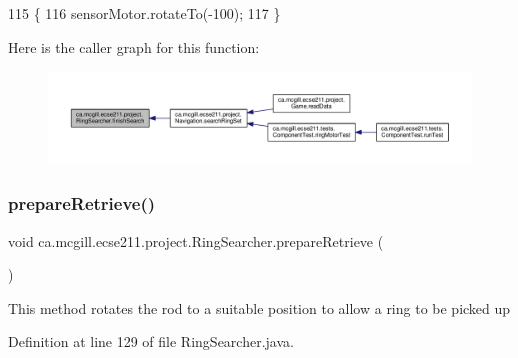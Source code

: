 \begin{DoxyCode}
115                              \{
116     sensorMotor.rotateTo(-100);
117   \}
\end{DoxyCode}
Here is the caller graph for this function\+:\nopagebreak
\begin{figure}[H]
\begin{center}
\leavevmode
\includegraphics[width=350pt]{classca_1_1mcgill_1_1ecse211_1_1project_1_1_ring_searcher_a6edfdbd31d9848ff885e2e4caa3b46c6_icgraph}
\end{center}
\end{figure}
\mbox{\label{classca_1_1mcgill_1_1ecse211_1_1project_1_1_ring_searcher_a3de30b85b1445157d7f8572992de7651}} 
\subsubsection{\texorpdfstring{prepare\+Retrieve()}{prepareRetrieve()}}
{\footnotesize\ttfamily void ca.\+mcgill.\+ecse211.\+project.\+Ring\+Searcher.\+prepare\+Retrieve (\begin{DoxyParamCaption}{ }\end{DoxyParamCaption})}

This method rotates the rod to a suitable position to allow a ring to be picked up 

Definition at line 129 of file Ring\+Searcher.\+java.


